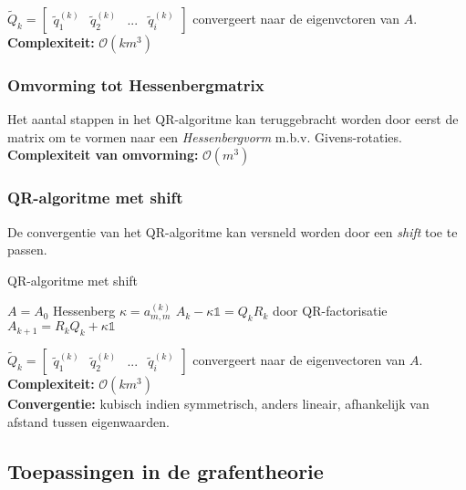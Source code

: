 \documentclass{article}
\begin{document}
	$\tilde{Q}_k = 
	\begin{bmatrix}
		\tilde{q}_1^{(k)} & \tilde{q}_2^{(k)} & ... & \tilde{q}_i^{(k)}
	\end{bmatrix}$ convergeert naar de eigenvctoren van $A$.\\
	
	
	\textbf{Complexiteit:} $\mathcal{O}(km^3)$
	
	\subsubsection{Omvorming tot Hessenbergmatrix}
	
	Het aantal stappen in het QR-algoritme kan teruggebracht worden door eerst de matrix om te vormen naar een \textit{Hessenbergvorm} m.b.v. Givens-rotaties.\\
		
	\textbf{Complexiteit van omvorming:} $\mathcal{O}(m^3)$
	
	\subsubsection{QR-algoritme met shift}
	
	De convergentie van het QR-algoritme kan versneld worden door een \textit{shift} toe te passen.
	

	
	\begin{algorithm}[!ht]
		\caption{QR-algoritme met shift}
		\begin{algorithmic}[1]
				\State $A=A_0$ Hessenberg
					\State $\kappa = a_{m,m}^{(k)}$
					\State $A_k - \kappa \mathbb{1} = Q_k R_k$ door QR-factorisatie
					\State $A_{k+1} = R_k Q_k + \kappa \mathbb{1}$
				\EndFor
			\EndProcedure
		\end{algorithmic}
	\end{algorithm}	
	$\tilde{Q}_k = 
	\begin{bmatrix}
	\tilde{q}_1^{(k)} & \tilde{q}_2^{(k)} & ... & \tilde{q}_i^{(k)}
	\end{bmatrix}$ convergeert naar de eigenvectoren van $A$.\\
	
	
	\textbf{Complexiteit:} $\mathcal{O}(km^3)$ \\
	\textbf{Convergentie:} kubisch indien symmetrisch, anders lineair, afhankelijk van afstand tussen eigenwaarden.
	
	\subsection{Toepassingen in de grafentheorie}
	
\end{document}
